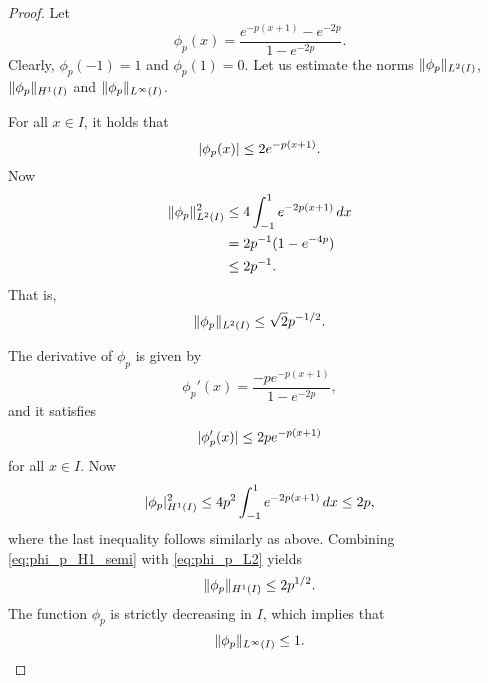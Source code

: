 \documentclass[english, 12pt, a4paper, sci, utf8, a-2b, online]{aaltothesis}
\theoremstyle{definition}
\theoremstyle{plain}
\DeclarePairedDelimiter\abs{\lvert}{\rvert}
\DeclarePairedDelimiter\norm{\lVert}{\rVert}
\newcommand*\diff{\mathop{}\!d}
\numberwithin{equation}{section}
\begin{document}
\begin{proof}
    Let
    \begin{equation*}
        \phi_p(x) = \frac{e^{-p(x+1)} - e^{-2p}}{1 - e^{-2p}}.
    \end{equation*}
    Clearly, $\phi_p(-1)=1$ and $\phi_p(1)=0$.
    Let us estimate the norms $\norm{\phi_p}_{L^2(I)}$,
    $\norm{\phi_p}_{H^1(I)}$ and $\norm{\phi_p}_{L^{\infty}(I)}$.

    For all $x \in I$, it holds that
    \begin{equation*}
       \abs{\phi_p(x)} \leq 2 e^{-p(x+1)}.
    \end{equation*}
    Now
    \begin{align*}
        \norm{\phi_p}_{L^2(I)}^2
        &\leq 4 \int_{-1}^{1} e^{-2p(x+1)} \diff x \\
        &= 2 p^{-1} (1 - e^{-4p}) \\
        &\leq 2 p^{-1}.
    \end{align*}
    That is, 
    \begin{equation}
        \label{eq:phi_p_L2}
        \norm{\phi_p}_{L^2(I)} \leq \sqrt{2} p^{-1/2}.
    \end{equation}

    The derivative of $\phi_p$ is given by
    \begin{equation*}
        \phi_p'(x) = \frac{-p e^{-p(x+1)}}{1 - e^{-2p}},
    \end{equation*}
    and it satisfies
    \begin{equation*}
        \abs{\phi_p'(x)} \leq 2 p e^{-p(x+1)}
    \end{equation*}
    for all $x \in I$. Now
    \begin{equation}
        \label{eq:phi_p_H1_semi}
        \abs{\phi_p}_{H^1(I)}^2
        \leq 4p^2 \int_{-1}^{1} e^{-2p(x+1)} \diff x
        \leq 2p,
    \end{equation}
    where the last inequality follows similarly as above.
    Combining \eqref{eq:phi_p_H1_semi} with \eqref{eq:phi_p_L2} yields
    \begin{equation}
        \label{eq:phi_p_H1}
        \norm{\phi_p}_{H^1(I)} \leq 2p^{1/2}.
    \end{equation}
    The function $\phi_p$ is strictly decreasing in $I$, which implies that
    \begin{equation}
        \label{eq:phi_p_Linfty}
        \norm{\phi_p}_{L^{\infty}(I)} \leq 1.
    \end{equation}


\end{proof}
\end{document}
